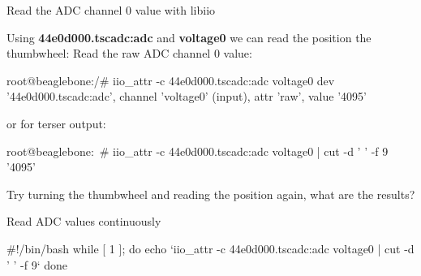 \begin{frame}
    {Read the ADC channel 0 value with libiio}

	Using \textbf{44e0d000.tscadc:adc} and \textbf{voltage0} we can read the position the thumbwheel:
	Read the raw ADC channel 0 value:
	\begin{rawscriptsize}
		root@beaglebone:/# iio_attr -c 44e0d000.tscadc:adc voltage0
		dev '44e0d000.tscadc:adc', channel 'voltage0' (input), attr 'raw', value '4095'
	\end{rawscriptsize}

	or for terser output:
	\begin{rawscriptsize}
		root@beaglebone:~# iio_attr -c 44e0d000.tscadc:adc voltage0 | cut -d ' ' -f 9
		'4095'
	\end{rawscriptsize}

	Try turning the thumbwheel and reading the position again, what are the results?
\end{frame}

\begin{frame}
    {Read ADC values continuously}

	\begin{rawscriptsize}
#!/bin/bash
while [ 1 ]; do
	echo `iio_attr -c 44e0d000.tscadc:adc voltage0 | cut -d ' ' -f 9`
done
	\end{rawscriptsize}
\end{frame}
